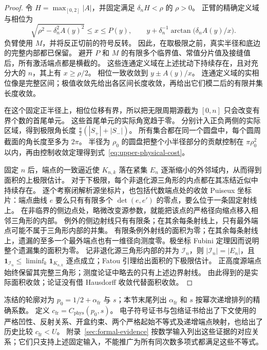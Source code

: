 \begin{proof}
令 $H=\max_{[0,2]}|A|$，并固定满足 $\delta_nH<\rho$ 的 $\rho>0$。
正臂的精确定义域与相位为
\[
 \sqrt{\rho^2-\delta_n^2A(y)^2}\le x\le P(y),\qquad
 y+\delta_n^{-1}\arctan\bigl(\delta_n A(y)/x\bigr).
\]
负臂使用 $M$，并将反正切前的符号反转。
因此，在取极限之前，真实半径和底边的完整内部都已保留。
避开 $P$ 和 $M$ 的有限多个临界值、常值分片值及接缝值后，所有激活端点都是横截的。
这些连通定义域在上述扰动下持续存在，且对充分大的 $n$，其上有 $x\ge\rho/2$。
相位一致收敛到 $y\pm A(y)/x$。
连通定义域的实相位像是完整区间；极值收敛先给出各区间长度收敛，再给出它们模二后的有限并集长度收敛。

在这个固定正半径上，相位位移有界，所以把无限周期源截为 $[0,n]$ 只会改变有界个数的首尾单元。
这些首尾单元的实际角宽趋于零。
分别计入正负两侧的实际区域，得到极限角长度 $\frac\pi2(|S_+|+|S_-|)$。
所有集合都在同一个圆盘中，每个圆周截面的角长度至多为 $2\pi$。
半径为 $\rho_0$ 的圆盘把整个小半径部分的贡献控制在 $\pi\rho_0^2$ 以内，再由控制收敛定理得到式~\eqref{eq:upper-physical-cost}。

固定 $n$ 后，端点的一致逼近使 $K_{n,k}$ 落在紧集 $E_n$ 逐渐缩小的外邻域内，从而得到面积的上极限估计。
对于下极限，每个非退化源三角形的内点都在其冻结近似中持续存在。
逐个考察闭解析源坐标片，也包括代数端点处的收敛 Puiseux 坐标片：端点曲线 $e$ 要么只有有限多个 $\det(e,e')$ 的零点，要么位于一条固定射线上。
在非临界的侧边点处，略微改变源参数，就能把该点的严格径向缩点移入相邻三角形的内部。
例外的侧边射线只有有限条；在其余每条射线上，只有最外端点可能不属于三角形内部的并集。
有限条例外射线的面积为零；在其余每条射线上，遗漏的至多一个最外端点也有一维径向测度零。极坐标 Fubini 定理因而说明整个遗漏集的面积为零。
记非退化源三角形内部的并为 $\mathcal I_n$，则 $|\mathcal I_n|=|E_n|$，且 $\mathbf1_{\mathcal I_n}\le\liminf_k\mathbf1_{K_{n,k}}$ 逐点成立；Fatou 引理给出面积的下极限估计。
正高度源端点始终保留其完整三角形；测度论证中略去的只有上述边界射线。
由此得到的是实际面积收敛；论证没有借 Hausdorff 收敛代替面积收敛。
\end{proof}

冻结的轮廓对为 $p_0=1/2+\alpha_{\mathrm{fr}}$ 与 $s$；本节末尾列出 $\alpha_{\mathrm{fr}}$ 和 $s$ 按幂次递增排列的精确系数。
定义 $c_{\mathrm{fr}}=C_{\mathrm{phys}}(p_0,s)$。
电子符号证书与包络证书给出了下文使用的严格凹性、反射关系、开盒约束、两个严格起始不等式及递增端点映射，也给出了历史比较 $c_{\mathrm{fr}}<U$。
附录~\ref{sec:formal-evidence} 按数学输入列出这些证据的对应关系；它们只支持上述固定输入，不能推广为所有同次数多项式都满足这些不等式。

